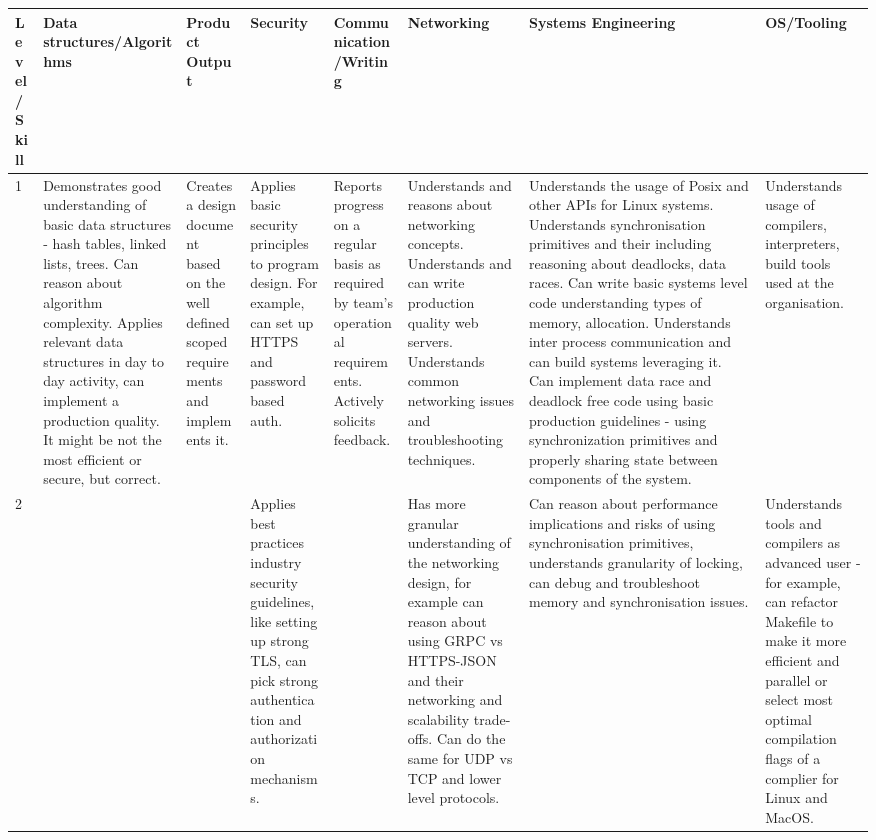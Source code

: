 \documentclass{article}
\begin{document}
\begin{center}
\begin{tabular}{ | m{15em} | m{15em} | m{15em} |  m{15em} | m{15em} |  m{15em} | m{15em} | m{15em} |}
  \hline
  \rowcolor{blue!60!black!10}
  Level/Skill & Data structures/Algorithms & Product Output & Security & Communication/Writing & Networking & Systems Engineering & OS/Tooling \\
  \hline
    1 &
    Demonstrates good understanding of basic data structures - hash tables, linked lists, trees. Can reason about algorithm complexity.
    Applies relevant data structures in day to day activity, can implement a production quality. It might be not the most efficient or secure, but correct. &
    Creates a design document based on the well defined scoped requirements and implements it. &
    Applies basic security principles to program design. For example, can set up HTTPS and password based auth. &
    Reports progress on a regular basis as required by team's operational requirements. Actively solicits feedback.&
    Understands and reasons about networking concepts. Understands and can write production quality web servers. Understands common networking issues and troubleshooting techniques. &
    Understands the usage of Posix and other APIs for Linux systems. Understands synchronisation primitives and their including reasoning about deadlocks, data races.
    Can write basic systems level code understanding types of memory, allocation.
    Understands inter process communication and can build systems leveraging it.
    Can implement data race and deadlock free code using basic production guidelines - using synchronization primitives and properly sharing state between components of the system.&
    Understands usage of compilers, interpreters, build tools used at the organisation. \\
  \hline
    2 & & &
    Applies best practices industry security guidelines, like setting up strong TLS, can pick strong authentication and authorization mechanisms.&
    &
    Has more granular understanding of the networking design, for example can reason about using GRPC vs HTTPS-JSON and their networking and scalability trade-offs.
    Can do the same for UDP vs TCP and lower level protocols.&
    Can reason about performance implications and risks of using synchronisation primitives, understands granularity of locking, can debug and troubleshoot memory and synchronisation issues.&
    Understands tools and compilers as advanced user - for example, can refactor Makefile to make it more efficient and parallel or select most optimal compilation flags of a complier for Linux and MacOS. \\

\end{tabular}
\end{center}
\end{document}
